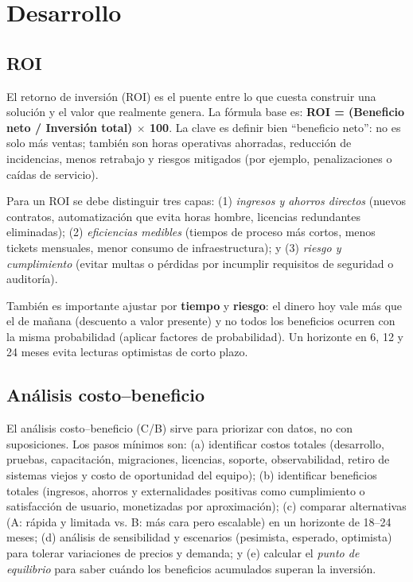 \documentclass[12pt]{article}
\begin{document}
\section{Desarrollo}

\subsection{ROI}
El retorno de inversión (ROI) es el puente entre lo que cuesta construir una solución y el valor que realmente genera. La fórmula base es: \textbf{ROI = (Beneficio neto / Inversión total) $\times$ 100}. La clave es definir bien ``beneficio neto'': no es solo más ventas; también son horas operativas ahorradas, reducción de incidencias, menos retrabajo y riesgos mitigados (por ejemplo, penalizaciones o caídas de servicio).

Para un ROI se debe distinguir tres capas: (1) \textit{ingresos y ahorros directos} (nuevos contratos, automatización que evita horas hombre, licencias redundantes eliminadas); (2) \textit{eficiencias medibles} (tiempos de proceso más cortos, menos tickets mensuales, menor consumo de infraestructura); y (3) \textit{riesgo y cumplimiento} (evitar multas o pérdidas por incumplir requisitos de seguridad o auditoría).

También es importante ajustar por \textbf{tiempo} y \textbf{riesgo}: el dinero hoy vale más que el de mañana (descuento a valor presente) y no todos los beneficios ocurren con la misma probabilidad (aplicar factores de probabilidad). Un horizonte en 6, 12 y 24 meses evita lecturas optimistas de corto plazo. 

\subsection{Análisis costo–beneficio}
El análisis costo–beneficio (C/B) sirve para priorizar con datos, no con suposiciones. Los pasos mínimos son: (a) identificar costos totales (desarrollo, pruebas, capacitación, migraciones, licencias, soporte, observabilidad, retiro de sistemas viejos y costo de oportunidad del equipo); (b) identificar beneficios totales (ingresos, ahorros y externalidades positivas como cumplimiento o satisfacción de usuario, monetizadas por aproximación); (c) comparar alternativas (A: rápida y limitada vs. B: más cara pero escalable) en un horizonte de 18–24 meses; (d) análisis de sensibilidad y escenarios (pesimista, esperado, optimista) para tolerar variaciones de precios y demanda; y (e) calcular el \textit{punto de equilibrio} para saber cuándo los beneficios acumulados superan la inversión.
\end{document}
